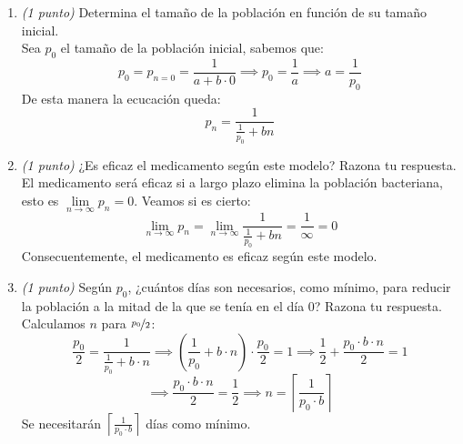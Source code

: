 \documentclass[12pt]{article}
\begin{document}
\begin{ejercicio}
\begin{enumerate}
                Por tanto, el modelo no puede ser una ecuación lineal autónoma.
            
            \item \emph{(1 punto)} Determina el tamaño de la población en función de su tamaño inicial. \\
                Sea $p_0$ el tamaño de la población inicial, sabemos que:
                 $$p_0 = p_{n=0} = \frac{1}{a+b \cdot 0} \implies p_0 = \frac{1}{a} \implies a = \frac{1}{p_0} $$
                De esta manera la ecucación queda:
                $$p_n = \frac{1}{\frac{1}{p_0} + bn}$$
                
            \item \emph{(1 punto)} ¿Es eficaz el medicamento según este modelo? Razona tu respuesta. \\
                El medicamento será eficaz si a largo plazo elimina la población bacteriana, esto es $\lim\limits_{n \to \infty} p_n = 0$. Veamos si es cierto:
                $$\lim_{n \to \infty} p_n = \lim_{n \to \infty} \frac{1}{\frac{1}{p_0} + bn} = \frac{1}{\infty} = 0$$ 
                Consecuentemente, el medicamento es eficaz según este modelo.

            \item \emph{(1 punto)} Según $p_0$, ¿cuántos días son necesarios, como mínimo, para reducir la población a la mitad de la que se tenía en el día 0? Razona tu respuesta. \\
                Calculamos $n$ para $\nicefrac{p_0}{2}$:
                $$\frac{p_0}{2} = \frac{1}{\frac{1}{p_0} + b \cdot n} \implies \left( \frac{1}{p_0} + b \cdot n \right) \cdot \frac{p_0}{2} = 1 \implies \frac{1}{2} + \frac{p_0 \cdot b \cdot n}{2} = 1$$ 
                $$\implies \frac{p_0 \cdot b \cdot n}{2} = \frac{1}{2} \implies n = \left\lceil \frac{1}{p_0 \cdot b} \right\rceil$$ 
                Se necesitarán $\displaystyle \left\lceil \frac{1}{p_0 \cdot b} \right\rceil$ días como mínimo.
        \end{enumerate}
    \end{ejercicio}
\end{document}
